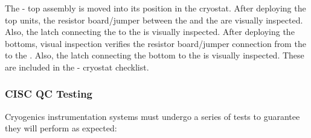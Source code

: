 The - top assembly is moved into its position in the cryostat.   
After deploying the  top units, the resistor board/jumper between the  and the   are visually inspected.  
Also, the latch connecting the  to the   is visually inspected.  After deploying the  bottoms, visual inspection verifies the resistor board/jumper connection from the  to the .  
Also, the latch connecting the  bottom to the  is visually inspected.  
These are included in the - cryostat checklist.



\subsubsection{CISC QC Testing}

Cryogenics instrumentation systems must undergo a series of tests to guarantee they will perform as expected: 

